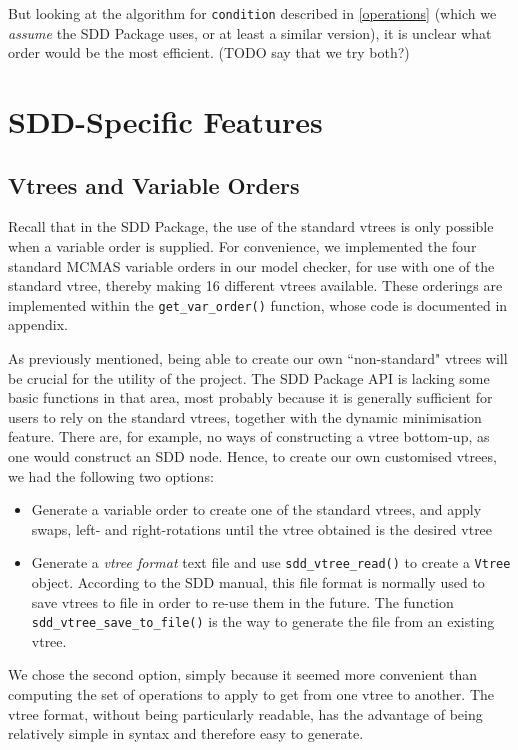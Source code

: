 \documentclass[11pt]{report}
\begin{document}
But looking at the algorithm for \texttt{condition} described in \ref{operations} (which we \textit{assume} the SDD Package uses, or at least a similar version), it is unclear what order would be the most efficient. (TODO say that we try both?)


\section{SDD-Specific Features}

\subsection{Vtrees and Variable Orders}

Recall that in the SDD Package, the use of the standard vtrees is only possible when a variable order is supplied. For convenience, we implemented the four standard MCMAS variable orders in our model checker, for use with one of the standard vtree, thereby making 16 different vtrees available. These orderings are implemented within the \texttt{get\_var\_order()} function, whose code is documented in appendix. 

As previously mentioned, being able to create our own ``non-standard" vtrees will be crucial for the utility of the project.  
The SDD Package API is lacking some basic functions in that area, most probably because it is generally sufficient for users to rely on the standard vtrees, together with the dynamic minimisation feature. There are, for example, no ways of constructing a vtree bottom-up, as one would construct an SDD node. Hence, to create our own customised vtrees, we had the following two options:
\begin{itemize}
\item Generate a variable order to create one of the standard vtrees, and apply swaps, left- and right-rotations until the vtree obtained is the desired vtree
\item Generate a \textit{vtree format} text file and use \texttt{sdd\_vtree\_read()} to create a \texttt{Vtree} object. According to the SDD manual, this file format is normally used to save vtrees to file in order to re-use them in the future. The function \texttt{sdd\_vtree\_save\_to\_file()} is the way to generate the file from an existing vtree.

\end{itemize}
We chose the second option, simply because it seemed more convenient than computing the set of operations to apply to get from one vtree to another. The vtree format, without being particularly readable, has the advantage of being relatively simple in syntax and therefore easy to generate. 
\end{document}
